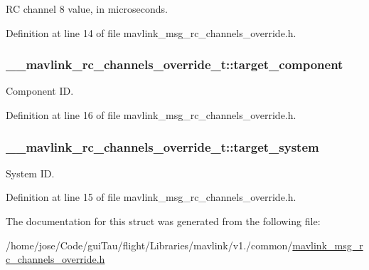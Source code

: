 R\-C channel 8 value, in microseconds. 



Definition at line 14 of file mavlink\-\_\-msg\-\_\-rc\-\_\-channels\-\_\-override.\-h.

\hypertarget{struct____mavlink__rc__channels__override__t_af53aa3ccd48e674dd69ad102616b4045}{
\subsubsection[{target\-\_\-component}]{ \-\_\-\-\_\-mavlink\-\_\-rc\-\_\-channels\-\_\-override\-\_\-t\-::target\-\_\-component}}\label{struct____mavlink__rc__channels__override__t_af53aa3ccd48e674dd69ad102616b4045}


Component I\-D. 



Definition at line 16 of file mavlink\-\_\-msg\-\_\-rc\-\_\-channels\-\_\-override.\-h.

\hypertarget{struct____mavlink__rc__channels__override__t_a0c5393c94e6462a75244ad5083f310f8}{
\subsubsection[{target\-\_\-system}]{ \-\_\-\-\_\-mavlink\-\_\-rc\-\_\-channels\-\_\-override\-\_\-t\-::target\-\_\-system}}\label{struct____mavlink__rc__channels__override__t_a0c5393c94e6462a75244ad5083f310f8}


System I\-D. 



Definition at line 15 of file mavlink\-\_\-msg\-\_\-rc\-\_\-channels\-\_\-override.\-h.



The documentation for this struct was generated from the following file\-:\begin{DoxyCompactItemize}
\item 
/home/jose/\-Code/gui\-Tau/flight/\-Libraries/mavlink/v1./common/\hyperlink{mavlink__msg__rc__channels__override_8h}{mavlink\-\_\-msg\-\_\-rc\-\_\-channels\-\_\-override.\-h}\end{DoxyCompactItemize}
